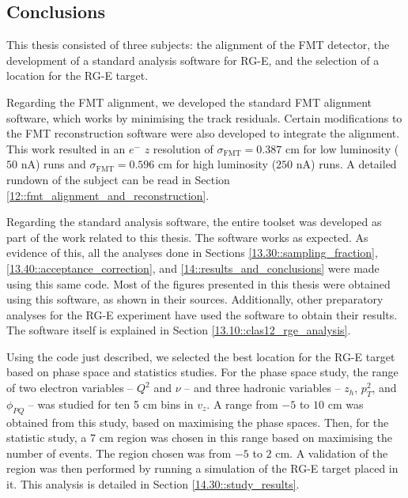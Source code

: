 \subsection{Conclusions}
\label{14.50::conclusions}
    This thesis consisted of three subjects: the alignment of the FMT detector, the development of a standard analysis software for RG-E, and the selection of a location for the RG-E target.

    Regarding the FMT alignment, we developed the standard FMT alignment software, which works by minimising the track residuals.
    Certain modifications to the FMT reconstruction software were also developed to integrate the alignment.
    This work resulted in an $e^-$ $z$ resolution of $\sigma_\text{FMT} = 0.387$ cm for low luminosity ($50$ nA) runs and $\sigma_\text{FMT} = 0.596$ cm for high luminosity ($250$ nA) runs.
    A detailed rundown of the subject can be read in Section \ref{12::fmt_alignment_and_reconstruction}.

    Regarding the standard analysis software, the entire toolset was developed as part of the work related to this thesis.
    The software works as expected.
    As evidence of this, all the analyses done in Sections \ref{13.30::sampling_fraction}, \ref{13.40::acceptance_correction}, and \ref{14::results_and_conclusions} were made using this same code.
    Most of the figures presented in this thesis were obtained using this software, as shown in their sources.
    Additionally, other preparatory analyses for the RG-E experiment have used the software to obtain their results.
    The software itself is explained in Section \ref{13.10::clas12_rge_analysis}.

    Using the code just described, we selected the best location for the RG-E target based on phase space and statistics studies.
    For the phase space study, the range of two electron variables -- $Q^2$ and $\nu$ -- and three hadronic variables -- $z_h$, $p_T^2$, and $\phi_{PQ}$ -- was studied for ten 5 cm bins in $v_z$.
    A range from $-5$ to $10$ cm was obtained from this study, based on maximising the phase spaces.
    Then, for the statistic study, a 7 cm region was chosen in this range based on maximising the number of events.
    The region chosen was from $-5$ to $2$ cm.
    A validation of the region was then performed by running a simulation of the RG-E target placed in it.
    This analysis is detailed in Section \ref{14.30::study_results}.

